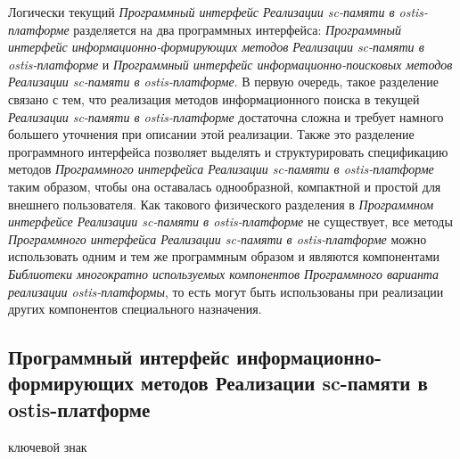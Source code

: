 Логически текущий \textit{Программный интерфейс Реализации sc-памяти в ostis-платформе} разделяется на два программных интерфейса: \textit{Программный интерфейс информационно-формирующих методов Реализации sc-памяти в ostis-платформе} и \textit{Программный интерфейс информационно-поисковых методов Реализации sc-памяти в ostis-платформе}. В первую очередь, такое разделение связано с тем, что реализация методов информационного поиска в текущей \textit{Реализации sc-памяти в ostis-платформе} достаточна сложна и требует намного большего уточнения при описании этой реализации. Также это разделение программного интерфейса позволяет выделять и структурировать спецификацию методов \textit{Программного интерфейса Реализации sc-памяти в ostis-платформе} таким образом, чтобы она оставалась однообразной, компактной и простой для внешнего пользователя. Как такового физического разделения в \textit{Программном интерфейсе Реализации sc-памяти в ostis-платформе} не существует, все методы \textit{Программного интерфейса Реализации sc-памяти в ostis-платформе} можно использовать одним и тем же программным образом и являются компонентами \textit{Библиотеки многократно используемых компонентов Программного варианта реализации ostis-платформы}, то есть могут быть использованы при реализации других компонентов специального назначения.

\subsection{Программный интерфейс информационно-формирующих методов Реализации sc-памяти в ostis-платформе}
\label{sec_soft_platform_information_creation_subsystem}

\begin{SCn}

\begin{scnrelfromlist}{ключевой знак}
\end{scnrelfromlist}

\end{SCn}

\bigskip

